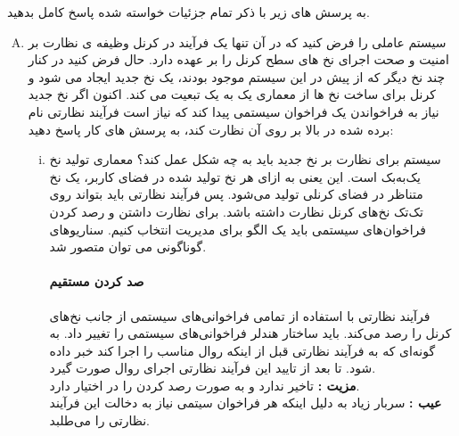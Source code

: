 \documentclass[]{article}
\begin{document}
ﺑﻪ ﭘﺮﺳﺶ ﻫﺎﯼ ﺯﯾﺮ ﺑﺎ ﺫﮐﺮ ﺗﻤﺎﻡ ﺟﺰﺋﯿﺎﺕ ﺧﻮﺍﺳﺘﻪ ﺷﺪﻩ ﭘﺎﺳﺦ ﮐﺎﻣﻞ ﺑﺪﻫﯿﺪ.
\begin{enumerate}[(A)]
      \item ﺳﯿﺴﺘﻢ ﻋﺎﻣﻠﯽ ﺭﺍ ﻓﺮﺽ ﮐﻨﯿﺪ ﮐﻪ ﺩﺭ ﺁﻥ ﺗﻨﻬﺎ ﯾﮏ ﻓﺮﺁﯾﻨﺪ ﺩﺭ ﮐﺮﻧﻞ ﻭﻇﯿﻔﻪ ﯼ ﻧﻈﺎﺭﺕ ﺑﺮ ﺍﻣﻨﯿﺖ ﻭ ﺻﺤﺖ ﺍﺟﺮﺍﯼ ﻧﺦ ﻫﺎﯼ ﺳﻄﺢ ﮐﺮﻧﻞ ﺭﺍ ﺑﺮ
            ﻋﻬﺪﻩ ﺩﺍﺭﺩ. ﺣﺎﻝ ﻓﺮﺽ ﮐﻨﯿﺪ ﺩﺭ ﮐﻨﺎﺭ ﭼﻨﺪ ﻧﺦ ﺩﯾﮕﺮ ﮐﻪ ﺍﺯ ﭘﯿﺶ ﺩﺭ ﺍﯾﻦ ﺳﯿﺴﺘﻢ ﻣﻮﺟﻮﺩ ﺑﻮﺩﻧﺪ، ﯾﮏ ﻧﺦ ﺟﺪﯾﺪ ﺍﯾﺠﺎﺩ ﻣﯽ ﺷﻮﺩ ﻭ ﮐﺮﻧﻞ ﺑﺮﺍﯼ
            ﺳﺎﺧﺖ ﻧﺦ ﻫﺎ ﺍﺯ ﻣﻌﻤﺎﺭﯼ ﯾﮏ ﺑﻪ ﯾﮏ ﺗﺒﻌﯿﺖ ﻣﯽ ﮐﻨﺪ. ﺍﮐﻨﻮﻥ ﺍﮔﺮ ﻧﺦ ﺟﺪﯾﺪ ﻧﯿﺎﺯ ﺑﻪ ﻓﺮﺍﺧﻮﺍﻧﺪﻥ ﯾﮏ ﻓﺮﺍﺧﻮﺍﻥ ﺳﯿﺴﺘﻤﯽ ﭘﯿﺪﺍ ﮐﻨﺪ ﮐﻪ ﻧﯿﺎﺯ
            ﺍﺳﺖ ﻓﺮﺁﯾﻨﺪ ﻧﻈﺎﺭﺗﯽ ﻧﺎﻡ ﺑﺮﺩﻩ ﺷﺪﻩ ﺩﺭ ﺑﺎﻻ ﺑﺮ ﺭﻭﯼ ﺁﻥ ﻧﻈﺎﺭﺕ ﮐﻨﺪ، ﺑﻪ ﭘﺮﺳﺶ ﻫﺎﯼ ﮐﺎﺭ ﭘﺎﺳﺦ ﺩﻫﯿﺪ:
            \begin{enumerate}[i.]
                  \item ﺳﯿﺴﺘﻢ ﺑﺮﺍﯼ ﻧﻈﺎﺭﺕ ﺑﺮ ﻧﺦ ﺟﺪﯾﺪ ﺑﺎﯾﺪ ﺑﻪ ﭼﻪ ﺷﮑﻞ ﻋﻤﻞ ﮐﻨﺪ؟
                        معماری تولید نخ یک‌به‌بک است. این یعنی به ازای هر نخ تولید شده در فضای کاربر، یک نخ متناظر در فضای کرنلی تولید می‌شود.
                        پس فرآیند نظارتی باید بتواند روی تک‌تک نخ‌های کرنل نظارت داشته باشد.
                        برای نظارت داشتن و رصد کردن فراخوان‌های سیستمی باید یک الگو برای مدیریت انتخاب کنیم. سناریو‌های گوناگونی می ‌توان متصور شد.
                        \vspace{-0.25cm}
                        \paragraph*{صد کردن مستقیم }
                        فرآیند نظارتی با استفاده از 
                        تمامی فراخوانی‌های سیستمی از جانب نخ‌های کرنل را رصد می‌کند. باید ساختار هندلر فراخوانی‌های سیستمی را تغییر داد.
                        به گونه‌ای که به فرآیند نظارتی قبل از اینکه روال مناسب را اجرا کند خبر داده شود. تا بعد از تایید این فرآیند نظارتی اجرای روال صورت گیرد.
                        \\
                        \textbf{مزیت : } تاخیر ندارد و به صورت  رصد کردن را در اختیار دارد.
                        \\
                        \textbf{عیب : } سربار زیاد به دلیل اینکه هر فراخوان سیتمی نیاز به دخالت این فرآیند نظارتی را می‌طلبد.
                        \vspace{-0.25cm}

\end{enumerate}
\end{enumerate}
\end{document}
